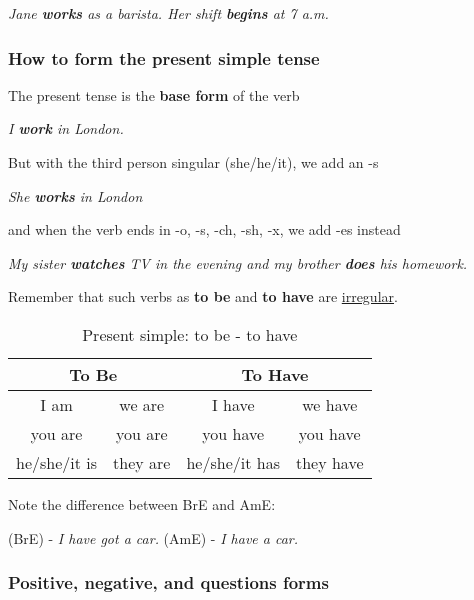 \documentclass[hidelinks,10pt,a4paper]{article}
\begin{document}
\begin{center}
	\textit{Jane \textbf{works} as a barista. Her shift \textbf{begins} at 7 a.m.}
\end{center}

\subsubsection{How to form the present simple tense}
The present tense is the \textbf{base form} of the verb
\begin{center}
	\textit{I \textbf{work} in London.}
\end{center}
But with the third person singular (she/he/it), we add an -s
\begin{center}
	\textit{She \textbf{works} in London}
\end{center}
and when the verb ends in -o, -s, -ch, -sh, -x, we add -es instead
\begin{center}
	\textit{My sister \textbf{watches} TV in the evening and my brother \textbf{does} his homework.}
\end{center}

Remember that such verbs as \textbf{to be} and \textbf{to have} are \underline{irregular}.

\begin{table}[h]
	\begin{center}
	\begin{tabular}{|c|c|c|c|}
		\hline
		\multicolumn{2}{|c|}{ \textbf{To Be}} & \multicolumn{2}{|c|}{ \textbf{To Have}} \\ \hline
		I am & we are & I have & we have \\ \hline
		you are & you are & you have & you have \\ \hline
		he/she/it is & they are & he/she/it has & they have \\ \hline
	\end{tabular}
\end{center}
\caption{\label{tab:presentsimple1}Present simple: to be - to have}
\end{table}

Note the difference between BrE and AmE:
\begin{center}
	(BrE) - \textit{I have got a car.} \quad (AmE) - \textit{I have a car.}
\end{center}

\subsubsection{Positive, negative, and questions forms}
\end{document}
